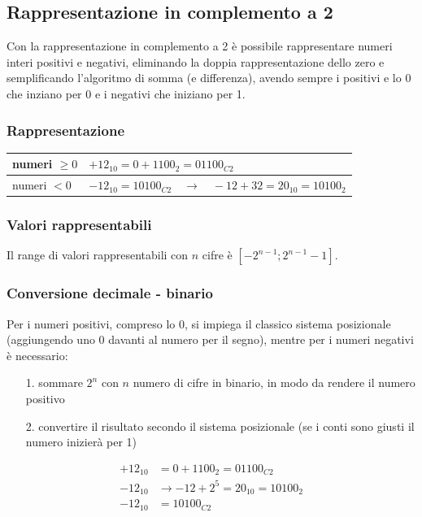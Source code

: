 \documentclass{article}
\begin{document}
\newpage


\subsection{Rappresentazione in complemento a 2}
Con la rappresentazione in complemento a 2 è possibile rappresentare numeri interi positivi e negativi, eliminando la
doppia rappresentazione dello zero e semplificando l'algoritmo di somma (e differenza), avendo sempre i positivi e lo
0 che inziano per 0 e i negativi che iniziano per 1.

\subsubsection*{Rappresentazione}
\begin{center}
	\begin{tabularx}{\textwidth}{l X}
		numeri \(\geq 0\) & \(+12_{10} = 0 + 1100_2 = 01100_{C2}\) \\
		\midrule
		numeri \(< 0\) & \(-12_{10} = 10100_{C2} \quad \rightarrow \quad -12 + 32 = 20_{10} = 10100_{2}\)
	\end{tabularx}
\end{center}

\subsubsection*{Valori rappresentabili}
Il range di valori rappresentabili con \(n\) cifre è \(\left[ - 2^{n - 1}; 2^{n - 1} - 1 \right]\).

\subsubsection*{Conversione decimale - binario}
Per i numeri positivi, compreso lo 0, si impiega il classico sistema posizionale (aggiungendo uno 0 davanti al
numero per il segno), mentre per i numeri negativi è necessario:
\begin{itemize}[topsep=3pt, itemsep=0pt]
	\item[1.] sommare \(2^n\) con \(n\) numero di cifre in binario, in modo da rendere il numero positivo
	\item[2.] convertire il risultato secondo il sistema posizionale (se i conti sono giusti il numero inizierà per 1)
\end{itemize}
\begin{align*}
	+12_{10} &= 0 + 1100_2 = 01100_{C2} \\
	-12_{10} &\rightarrow -12 + 2^5 = 20_{10} = 10100_{2} \\
	-12_{10} &= 10100_{C2}
\end{align*}
\end{document}
